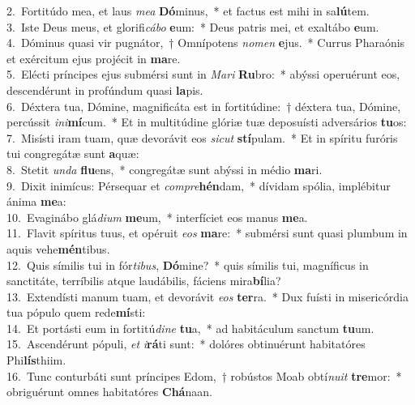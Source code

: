 {2.~}Fortitúdo mea, et laus \textit{me}\textit{a} \textbf{Dó}minus,~* et factus est mihi in sa\textbf{lú}tem.\\
{3.~}Iste Deus meus, et glorifi\textit{cá}\textit{bo} \textbf{e}um:~* Deus patris mei, et exaltábo \textbf{e}um.\\
{4.~}Dóminus quasi vir pugnátor,~† Omnípotens \textit{no}\textit{men} \textbf{e}jus.~* Currus Pharaónis et exércitum ejus projécit in \textbf{ma}re.\\
{5.~}Elécti príncipes ejus submérsi sunt in \textit{Ma}\textit{ri} \textbf{Ru}bro:~* abýssi operuérunt eos, descendérunt in profúndum quasi \textbf{la}pis.\\
{6.~}Déxtera tua, Dómine, magnificáta est in fortitúdine:~† déxtera tua, Dómine, percússit \textit{i}\textit{ni}\textbf{mí}cum.~* Et in multitúdine glóriæ tuæ deposuísti adversários \textbf{tu}os:\\
{7.~}Misísti iram tuam, quæ devorávit eos \textit{si}\textit{cut} \textbf{stí}pulam.~* Et in spíritu furóris tui congregátæ sunt \textbf{a}quæ:\\
{8.~}Stetit \textit{un}\textit{da} \textbf{flu}ens,~* congregátæ sunt abýssi in médio \textbf{ma}ri.\\
{9.~}Dixit inimícus: Pérsequar et \textit{com}\textit{pre}\textbf{hén}dam,~* dívidam spólia, implébitur ánima \textbf{me}a:\\
{10.~}Evaginábo glá\textit{di}\textit{um} \textbf{me}um,~* interfíciet eos manus \textbf{me}a.\\
{11.~}Flavit spíritus tuus, et opéruit \textit{e}\textit{os} \textbf{ma}re:~* submérsi sunt quasi plumbum in aquis vehe\textbf{mén}tibus.\\
{12.~}Quis símilis tui in fór\textit{ti}\textit{bus}, \textbf{Dó}mine?~* quis símilis tui, magníficus in sanctitáte, terríbilis atque laudábilis, fáciens mira\textbf{bí}lia?\\
{13.~}Extendísti manum tuam, et devorávit \textit{e}\textit{os} \textbf{ter}ra.~* Dux fuísti in misericórdia tua pópulo quem rede\textbf{mí}sti:\\
{14.~}Et portásti eum in fortitú\textit{di}\textit{ne} \textbf{tu}a,~* ad habitáculum sanctum \textbf{tu}um.\\
{15.~}Ascendérunt pópuli, \textit{et} \textit{i}\textbf{rá}ti sunt:~* dolóres obtinuérunt habitatóres Phi\textbf{lís}thiim.\\
{16.~}Tunc conturbáti sunt príncipes Edom,~† robústos Moab obtí\textit{nu}\textit{it} \textbf{tre}mor:~* obriguérunt omnes habitatóres \textbf{Chá}naan.\\
